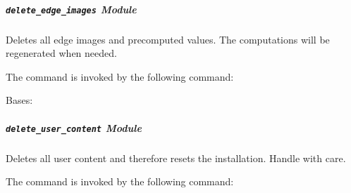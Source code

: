 \documentclass[letterpaper,10pt,english]{sphinxmanual}
\begin{document}
\subparagraph{\texttt{delete\_edge\_images} Module}
\label{Contour.contour.management.commands:delete-edge-images-module}\label{Contour.contour.management.commands:module-Contour.contour.management.commands.delete_edge_images}
Deletes all edge images and precomputed values. The computations will be regenerated when needed.

The command is invoked by the following command: 

\begin{fulllineitems}
\label{Contour.contour.management.commands:Contour.contour.management.commands.delete_edge_images.Command}
Bases: 

\begin{fulllineitems}
\label{Contour.contour.management.commands:Contour.contour.management.commands.delete_edge_images.Command.handle}
\end{fulllineitems}


\begin{fulllineitems}
\label{Contour.contour.management.commands:Contour.contour.management.commands.delete_edge_images.Command.help}
\end{fulllineitems}


\end{fulllineitems}



\subparagraph{\texttt{delete\_user\_content} Module}
\label{Contour.contour.management.commands:delete-user-content-module}\label{Contour.contour.management.commands:module-Contour.contour.management.commands.delete_user_content}
Deletes all user content and therefore resets the installation. Handle with care.

The command is invoked by the following command: 
\end{document}
